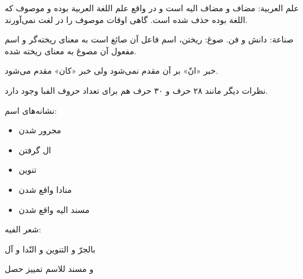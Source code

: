 \documentclass{article}
\begin{document}
\begin{addpage}{1}
  \vspace*{6cm}
  \begin{note}
    علم العربیة: مضاف و مضاف الیه است و در واقع علم اللغة العربیة بوده و موصوف که اللغة بوده حذف شده است. 
    گاهی اوقات موصوف را در لغت نمی‌آورند.
  \end{note}
  \begin{note}
    صناعة: دانش و فن.
    صوغ: ریختن، اسم فاعل آن صائغ است به معنای ریخته‌گر و اسم مفعول آن مصوغ به معنای ریخته شده.
  \end{note}
  \begin{note}
    خبر «انّ» بر آن مقدم نمی‌شود ولی خبر «کان» مقدم می‌شود.
  \end{note}
  \vspace*{4cm}
  \begin{note}
    نظرات دیگر مانند ۲۸ حرف و ۳۰ حرف هم برای تعداد حروف الفبا وجود دارد.
  \end{note}
  \begin{note}
    نشانه‌های اسم:
    \begin{itemize}
    \item مجرور شدن
    \item ال گرفتن
    \item تنوین
    \item منادا واقع شدن
    \item مسند الیه واقع شدن
    \end{itemize}
    
    شعر الفیه:

    بالجرّ و التنوين و النّدا و آل
    
    و مسند للاسم تمييز حصل


  \end{note}
\end{addpage}
\end{document}
